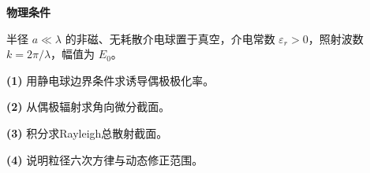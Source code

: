 \textbf{物理条件}\par 半径 \(a\ll\lambda\) 的非磁、无耗散介电球置于真空，介电常数 \(\varepsilon_r>0\)，照射波数 \(k=2\pi/\lambda\)，幅值为 \(E_0\)。
\par\noindent\textbf{(1)} 用静电球边界条件求诱导偶极极化率。
\par\noindent\textbf{(2)} 从偶极辐射求角向微分截面。
\par\noindent\textbf{(3)} 积分求Rayleigh总散射截面。
\par\noindent\textbf{(4)} 说明粒径六次方律与动态修正范围。

